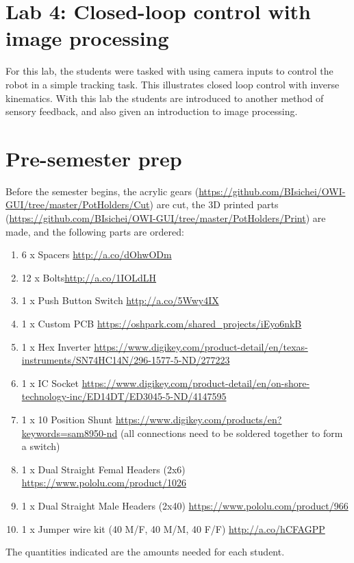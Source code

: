 \section{Lab  4: Closed-loop control with image processing}

For this lab, the students were tasked with using camera inputs to control the robot in a simple tracking task. This illustrates closed loop control with inverse kinematics. With this lab the students are introduced to another method of sensory feedback, and also given an  introduction to image processing.



\section{Pre-semester prep}
 
Before the semester begins, the acrylic gears (\url{https://github.com/BIsichei/OWI-GUI/tree/master/PotHolders/Cut}) are cut, the 3D printed parts (\url{https://github.com/BIsichei/OWI-GUI/tree/master/PotHolders/Print}) are made, and the following parts are ordered: 
\begin{enumerate}
\item 6 x Spacers \url{http://a.co/dOhwODm } 
\item 12 x Bolts\url{http://a.co/1IOLdLH } 
\item 1 x Push Button Switch \url{http://a.co/5Wwy4IX } 
\item 1 x Custom PCB \url{https://oshpark.com/shared_projects/iEyo6nkB}
\item 1 x Hex Inverter \url{https://www.digikey.com/product-detail/en/texas-instruments/SN74HC14N/296-1577-5-ND/277223}
\item 1 x IC Socket \url{https://www.digikey.com/product-detail/en/on-shore-technology-inc/ED14DT/ED3045-5-ND/4147595}
\item 1 x 10 Position Shunt \url{https://www.digikey.com/products/en?keywords=sam8950-nd}  (all connections need to be soldered together to form a switch)
\item 1 x Dual Straight Femal Headers (2x6) \url{https://www.pololu.com/product/1026}
\item 1 x Dual Straight Male Headers (2x40) \url{https://www.pololu.com/product/966}
\item 1 x Jumper wire kit (40 M/F, 40 M/M, 40 F/F) \url{http://a.co/hCFAGPP}
\end{enumerate}
The quantities indicated are the amounts needed for each student. 


